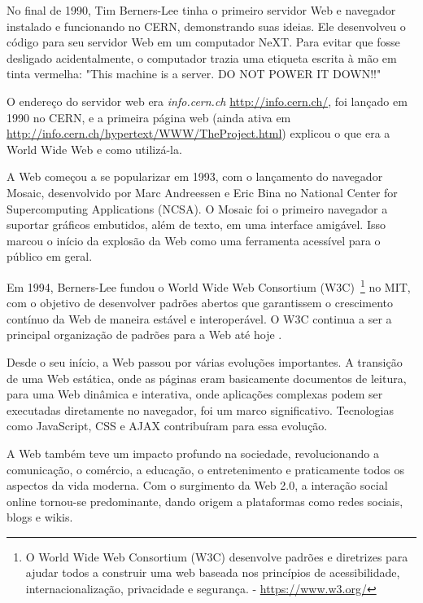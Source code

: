 No final de 1990, Tim Berners-Lee tinha o primeiro servidor Web e navegador instalado e funcionando no CERN, demonstrando suas ideias. Ele desenvolveu o código para seu servidor Web em um computador NeXT. Para evitar que fosse desligado acidentalmente, o computador trazia uma etiqueta escrita à mão em tinta vermelha: "This machine is a server. DO NOT POWER IT DOWN!!"

O endereço do servidor web era \textit{info.cern.ch} \url{http://info.cern.ch/}, foi lançado em 1990 no CERN, e a primeira página web (ainda ativa em \url{http://info.cern.ch/hypertext/WWW/TheProject.html}) explicou o que era a World Wide Web e como utilizá-la.

A Web começou a se popularizar em 1993, com o lançamento do navegador Mosaic, desenvolvido por Marc Andreessen e Eric Bina no National Center for Supercomputing Applications (NCSA). O Mosaic foi o primeiro navegador a suportar gráficos embutidos, além de texto, em uma interface amigável. Isso marcou o início da explosão da Web como uma ferramenta acessível para o público em geral.

Em 1994, Berners-Lee fundou o World Wide Web Consortium (W3C)~\footnote{ O World Wide Web Consortium (W3C) desenvolve padrões e diretrizes para ajudar todos a construir uma web baseada nos princípios de acessibilidade, internacionalização, privacidade e segurança. - \url{https://www.w3.org/}} no MIT, com o objetivo de desenvolver padrões abertos que garantissem o crescimento contínuo da Web de maneira estável e interoperável. O W3C continua a ser a principal organização de padrões para a Web até hoje .

Desde o seu início, a Web passou por várias evoluções importantes. A transição de uma Web estática, onde as páginas eram basicamente documentos de leitura, para uma Web dinâmica e interativa, onde aplicações complexas podem ser executadas diretamente no navegador, foi um marco significativo. Tecnologias como JavaScript, CSS e AJAX contribuíram para essa evolução.

A Web também teve um impacto profundo na sociedade, revolucionando a comunicação, o comércio, a educação, o entretenimento e praticamente todos os aspectos da vida moderna. Com o surgimento da Web 2.0, a interação social online tornou-se predominante, dando origem a plataformas como redes sociais, blogs e wikis.

